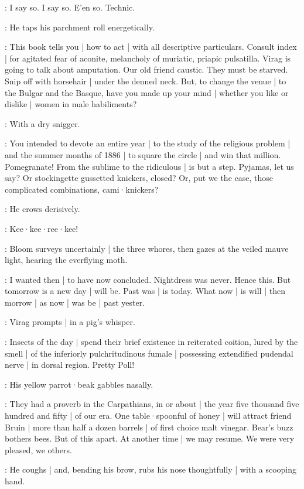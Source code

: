 \Virag:
I say so.
I say so.
E'en so.
Technic.

:
He taps his parchment roll energetically.

\Virag:
This book tells you |
how to act |
with all descriptive particulars.
Consult index |
for agitated fear of aconite,
melancholy of muriatic,
priapic pulsatilla.
Virag is going to talk about amputation.
Our old friend caustic.
They must be starved.
Snip off with horsehair |
under the denned neck.
But,
to change the venue |
to the Bulgar and the Basque,
have you made up your mind |
whether you like or dislike |
women in male habiliments?

:
With a dry snigger.

\Virag:
You intended to devote an entire year |
to the study of the religious problem |
and the summer months of 1886 |
to square the circle |
and win that million.
Pomegranate!
From the sublime to the ridiculous |
is but a step.
Pyjamas,
let us say?
Or stockingette gussetted knickers,
closed?
Or,
put we the case,
those complicated com\-binations,
cami·knickers?

:
He crows derisively.

\Virag:
Kee·kee·ree·kee!

:
Bloom surveys uncertainly |
the three whores,
then gazes at the veiled mauve light,
hearing the everflying moth.

\Bloom:
I wanted then |
to have now concluded.
Nightdress was never.
Hence this.
But tomorrow is a new day |
will be.
Past was |
is today.
What now |
is will |
then morrow |
as now |
was be |
past yester.

:
Virag prompts |
in a pig's whisper.

\Virag:
Insects of the day |
spend their brief existence in reiterated coition,
lured by the smell |
of the inferiorly pulchritudinous fumale |
possessing extendified pudendal nerve |
in dorsal region.
Pretty Poll!

:
His yellow parrot·beak gabbles nasally.

\Virag:
They had a proverb in the Carpathians,
in or about |
the year five thousand five hundred and fifty |
of our era.
One table·spoonful of honey |
will attract friend Bruin |
more than half a dozen barrels |
of first choice malt vinegar.
Bear's buzz bothers bees.
But of this apart.
At another time |
we may resume.
We were very pleased,
we others.

:
He coughs |
and,
bending his brow,
rubs his nose thoughtfully |
with a scooping hand.

